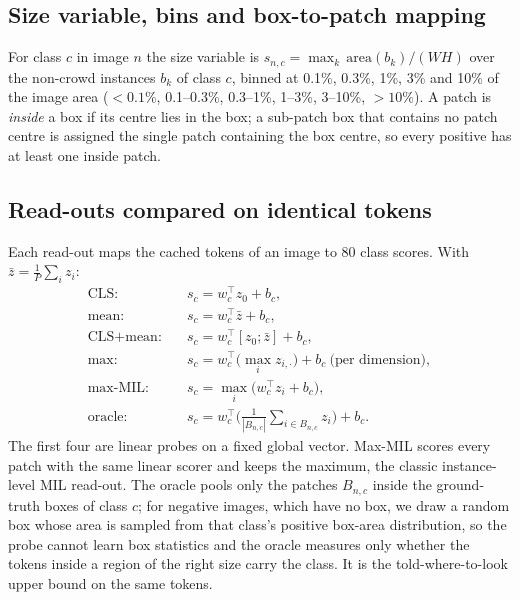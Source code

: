 \documentclass[10pt,letterpaper,twocolumn]{article}
\begin{document}
\subsection{Size variable, bins and box-to-patch mapping}
\label{sec:bins}
For class $c$ in image $n$ the size variable is $s_{n,c}=\max_{k}\,\mathrm{area}(b_k)/(W H)$
over the non-crowd instances $b_k$ of class $c$, binned at 0.1\%, 0.3\%, 1\%, 3\% and 10\%
of the image area ($<0.1\%$, 0.1--0.3\%, 0.3--1\%, 1--3\%, 3--10\%, $>10\%$). A patch is \emph{inside} a box if its centre lies in the
box; a sub-patch box that contains no patch centre is assigned the single patch containing the
box centre, so every positive has at least one inside patch.

\subsection{Read-outs compared on identical tokens}
Each read-out maps the cached tokens of an image to 80 class scores. With $\bar z =
\frac{1}{P}\sum_i z_i$:
\begin{align*}
\text{CLS:}&\quad s_c = w_c^{\top} z_0 + b_c,\\
\text{mean:}&\quad s_c = w_c^{\top} \bar z + b_c,\\
\text{CLS+mean:}&\quad s_c = w_c^{\top} [z_0;\bar z] + b_c,\\
\text{max:}&\quad s_c = w_c^{\top} \big(\max_i z_{i,\cdot}\big) + b_c \ \text{(per dimension)},\\
\text{max-MIL:}&\quad s_c = \max_i \big(w_c^{\top} z_i + b_c\big),\\
\text{oracle:}&\quad s_c = w_c^{\top}\Big(\tfrac{1}{|B_{n,c}|}\textstyle\sum_{i\in B_{n,c}} z_i\Big) + b_c .
\end{align*}
The first four are linear probes on a fixed global vector. Max-MIL scores every patch with the
same linear scorer and keeps the maximum, the classic instance-level MIL read-out. The oracle
pools only the patches $B_{n,c}$ inside the ground-truth boxes of class $c$; for negative
images, which have no box, we draw a random box whose area is sampled from that class's
positive box-area distribution, so the probe cannot learn box statistics and the oracle
measures only whether the tokens inside a region of the right size carry the class. It is the
told-where-to-look upper bound on the same tokens.
\end{document}

